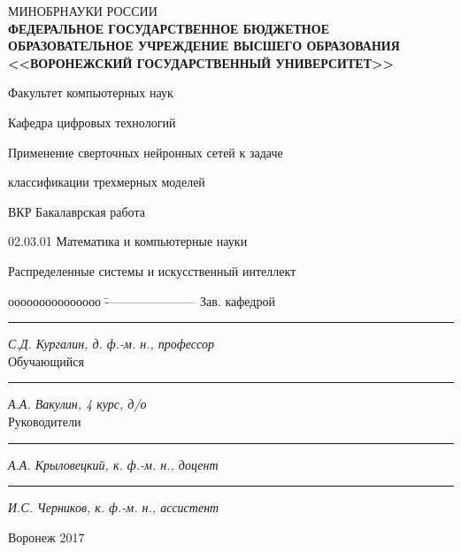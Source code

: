 \documentclass[14pt]{article}
\numberwithin{figure}{section}
\numberwithin{equation}{section}
\begin{document}
\begin{titlepage}

\thispagestyle{empty}
\center
\textsc{МИНОБРНАУКИ РОССИИ}\\
\textbf{ФЕДЕРАЛЬНОЕ ГОСУДАРСТВЕННОЕ БЮДЖЕТНОЕ ОБРАЗОВАТЕЛЬНОЕ УЧРЕЖДЕНИЕ ВЫСШЕГО ОБРАЗОВАНИЯ\\<<ВОРОНЕЖСКИЙ ГОСУДАРСТВЕННЫЙ УНИВЕРСИТЕТ>>}

\vspace{0.3cm}

\centerline{Факультет компьютерных наук}
\centerline{Кафедра цифровых технологий}

\vspace{1cm}

\centerline{Применение сверточных нейронных сетей к задаче }
\centerline{классификации трехмерных моделей}

\vspace{1cm}

\centerline{ВКР Бакалаврская работа}
\centerline{02.03.01 Математика и компьютерные науки}
\centerline{Распределенные системы и искусственный интеллект}

\vfill
{}
\begin{tabbing}
ооооооооооооооо	\=	----------------------	\kill
Зав. кафедрой	\> 	\rule[0mm]{4cm}{0,3mm}	\textit{С.Д. Кургалин, д. ф.-м. н., профессор} \\
Обучающийся 	\> 	\rule[0mm]{4cm}{0,3mm}	\textit{А.А. Вакулин, 4 курс, д/о}             \\
Руководители	\> 	\rule[0mm]{4cm}{0,3mm}  \textit{А.А. Крыловецкий, к. ф.-м. н., доцент} \\
				\> 	\rule[0mm]{4cm}{0,3mm}  \textit{И.С. Черников, к. ф.-м. н., ассистент}
\end{tabbing}

\vfill

\centerline{Воронеж 2017}
\clearpage
\end{titlepage}

\end{document}
